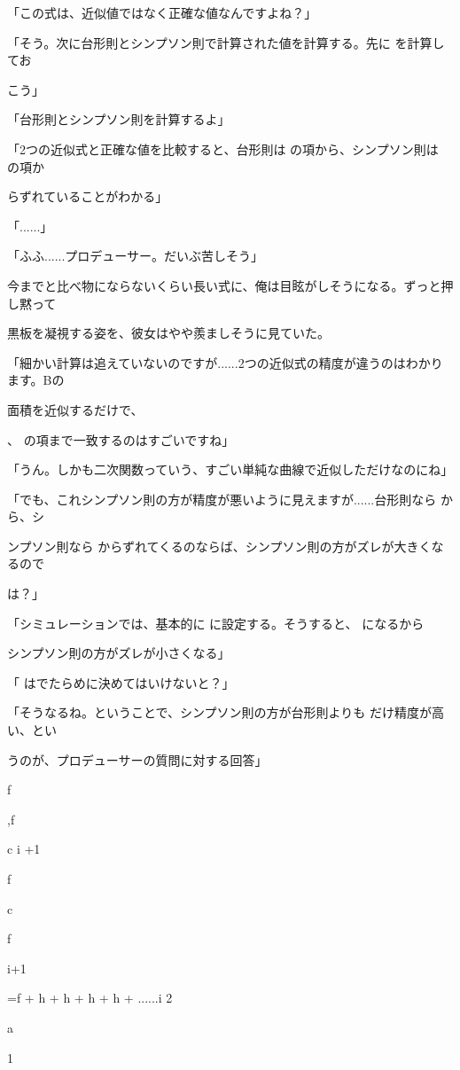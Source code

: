 「この式は、近似値ではなく正確な値なんですよね？」\par
「そう。次に台形則とシンプソン則で計算された値を計算する。先に を計算してお\par
こう」\par
「台形則とシンプソン則を計算するよ」\par
「2つの近似式と正確な値を⽐較すると、台形則は の項から、シンプソン則は の項か\par
らずれていることがわかる」\par
「......」\par
「ふふ......プロデューサー。だいぶ苦しそう」\par
今までと⽐べ物にならないくらい長い式に、俺は⽬眩がしそうになる。ずっと押し黙って\par
黒板を凝視する姿を、彼⼥はやや羨ましそうに⾒ていた。\par
「細かい計算は追えていないのですが......2つの近似式の精度が違うのはわかります。Bの\par
⾯積を近似するだけで、\par
、 の項まで⼀致するのはすごいですね」\par
「うん。しかも⼆次関数っていう、すごい単純な曲線で近似しただけなのにね」\par
「でも、これシンプソン則の⽅が精度が悪いように⾒えますが......台形則なら から、シ\par
ンプソン則なら からずれてくるのならば、シンプソン則の⽅がズレが⼤きくなるので\par
は？」\par
「シミュレーションでは、基本的に に設定する。そうすると、 になるから\par
シンプソン則の⽅がズレが⼩さくなる」\par
「 はでたらめに決めてはいけないと？」\par
「そうなるね。ということで、シンプソン則の⽅が台形則よりも だけ精度が⾼い、とい\par
うのが、プロデューサーの質問に対する回答」\par
f\par
,f\par
c i +1\par
f\par
c\par
f\par
i+1\par
=f  +  h +  h +  h +  h + ......i 2\par
a\par
1\par
